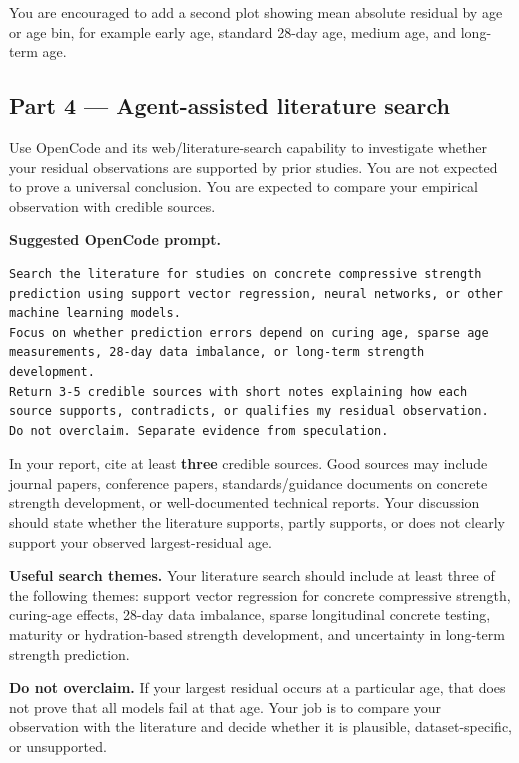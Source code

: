 \documentclass[12pt]{article}
\begin{document}
You are encouraged to add a second plot showing mean absolute residual by age or age bin, for example early age, standard 28-day age, medium age, and long-term age.

\subsection{Part 4 --- Agent-assisted literature search}

Use OpenCode and its web/literature-search capability to investigate whether your residual observations are supported by prior studies.  You are not expected to prove a universal conclusion.  You are expected to compare your empirical observation with credible sources.

\begin{ex-box}
\textbf{Suggested OpenCode prompt.}
\begin{lstlisting}[style=term]
Search the literature for studies on concrete compressive strength prediction using support vector regression, neural networks, or other machine learning models.
Focus on whether prediction errors depend on curing age, sparse age measurements, 28-day data imbalance, or long-term strength development.
Return 3-5 credible sources with short notes explaining how each source supports, contradicts, or qualifies my residual observation.
Do not overclaim. Separate evidence from speculation.
\end{lstlisting}
\end{ex-box}

In your report, cite at least \textbf{three} credible sources.  Good sources may include journal papers, conference papers, standards/guidance documents on concrete strength development, or well-documented technical reports.  Your discussion should state whether the literature supports, partly supports, or does not clearly support your observed largest-residual age.

\begin{def-box}
\textbf{Useful search themes.}  Your literature search should include at least three of the following themes: support vector regression for concrete compressive strength, curing-age effects, 28-day data imbalance, sparse longitudinal concrete testing, maturity or hydration-based strength development, and uncertainty in long-term strength prediction.
\end{def-box}

\begin{alert-box}
\textbf{Do not overclaim.}  If your largest residual occurs at a particular age, that does not prove that all models fail at that age.  Your job is to compare your observation with the literature and decide whether it is plausible, dataset-specific, or unsupported.
\end{alert-box}
\end{document}
